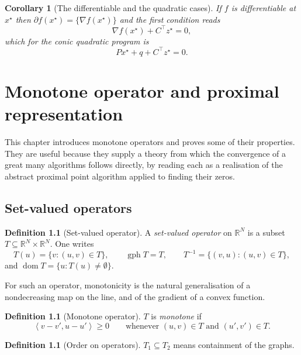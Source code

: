 \documentclass[a4paper,11pt]{book}
\theoremstyle{plain}
\newtheorem{corollary}[theorem]{Corollary}
\theoremstyle{definition}
\newtheorem{definition}[theorem]{Definition}
\theoremstyle{remark}
\numberwithin{equation}{chapter}
\numberwithin{algorithm}{chapter}
\newcommand{\R}{\mathbb{R}}
\newcommand{\inner}[2]{\left\langle #1, #2 \right\rangle}
\newcommand{\dom}{\operatorname{dom}}
\newcommand{\gph}{\operatorname{gph}}
\begin{document}
	\begin{corollary}[The differentiable and the quadratic cases]
		If $f$ is differentiable at $x^\star$ then $\partial f(x^\star)
		=\{\nabla f(x^\star)\}$ and the first condition reads
		\begin{equation}
			\nabla f(x^\star)+C^\top z^\star=0 ,
		\end{equation}
		which for the conic quadratic program is
		\begin{equation}
			Px^\star+q+C^\top z^\star=0 .
		\end{equation}
	\end{corollary}
	
	\chapter{Monotone operator and proximal representation}
	
	This chapter introduces monotone operators and proves some of their
	properties. They are useful because they supply a theory from which the
	convergence of a great many algorithms follows directly, by reading each as a
	realisation of the abstract proximal point algorithm applied to finding their
	zeros.
	
	\section{Set-valued operators}
	
	\begin{definition}[Set-valued operator]
		A \emph{set-valued operator} on $\R^N$ is a subset $T\subseteq\R^N\times\R^N$.
		One writes
		\begin{equation}
			T(u)=\{v:(u,v)\in T\},
			\qquad
			\gph T=T,
			\qquad
			T^{-1}=\{(v,u):(u,v)\in T\},
		\end{equation}
		and $\dom T=\{u:T(u)\neq\emptyset\}$.
	\end{definition}
	
	For such an operator, monotonicity is the natural generalisation of a
	nondecreasing map on the line, and of the gradient of a convex function.
	\begin{definition}[Monotone operator]
		$T$ is \emph{monotone} if
		\begin{equation}
			\inner{v-v'}{u-u'}\geq0
			\qquad\text{whenever }(u,v)\in T\text{ and }(u',v')\in T .
		\end{equation}
	\end{definition}
	
	\begin{definition}[Order on operators]
		$T_1\subseteq T_2$ means containment of the graphs.
	\end{definition}
	
\end{document}
